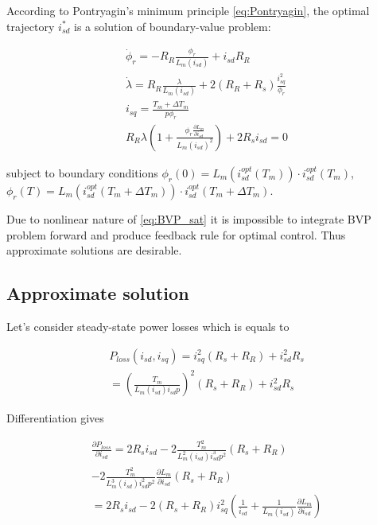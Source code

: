 \documentclass[journal]{IEEEtran}
\begin{document}
According to Pontryagin's minimum principle \eqref{eq:Pontryagin}, the optimal trajectory $i_{sd}^*$ is a solution of boundary-value problem:

\begin{equation}\label{eq:BVP_sat}
\begin{gathered}
\dot \phi_r = -R_R \frac{\phi_r}{L_m(i_{sd})} + i_{sd} R_R \\
\dot \lambda = R_R \frac{ \lambda}{L_m(i_{sd})} + 2 (R_R + R_s) \frac{i_{sq}^2}{\phi_r} \\
i_{sq} = \frac{T_m + \Delta T_m}{p \phi_r} \\
R_R \lambda \left( 1 + \frac{\phi_r \frac{\partial L_m}{\partial i_{sd}}}{L_m(i_{sd})^2} \right ) + 2 R_s i_{sd} = 0
\end{gathered}
\end{equation}

subject to boundary conditions $\phi_r(0) = L_m(i_{sd}^{opt}(T_m)) \cdot i_{sd}^{opt}(T_m)$, $\phi_r(T) = L_m(i_{sd}^{opt}(T_m+\Delta T_m)) \cdot i_{sd}^{opt}(T_m+\Delta T_m)$. 

Due to nonlinear nature of \eqref{eq:BVP_sat} it is impossible to integrate BVP problem forward and produce feedback rule for optimal control. Thus approximate solutions are desirable.

\subsection{Approximate solution}

Let's consider steady-state power losses which is equals to  

\begin{equation}\label{eq:P_loss_sat}
\begin{gathered}
 P_{loss}(i_{sd}, i_{sq}) = i_{sq}^2 (R_s + R_R) + i_{sd}^2 R_s \\
 = \left ( \frac{T_m}{L_m(i_{sd}) i_{sd} p} \right )^2 (R_s + R_R) + i_{sd}^2 R_s 
\end{gathered}
\end{equation}

Differentiation gives

\begin{equation}\label{eq:dP_loss_sat}
\begin{gathered}
\frac{\partial P_{loss}}{\partial i_{sd}} = 2 R_s i_{sd} - 2 \frac{T_m^2 }{L_m^2(i_{sd}) i_{sd}^3 p^2} (R_s + R_R) \\
- 2 \frac{T_m^2 }{L_m^3(i_{sd}) i_{sd}^2 p^2} \frac{\partial L_m}{\partial i_{sd}} (R_s + R_R) \\
= 2 R_s i_{sd} - 2 (R_s + R_R) i_{sq}^2 \left ( \frac{1}{i_{sd}} + \frac{1}{L_m(i_{sd})} \frac{\partial L_m}{\partial i_{sd}} \right )
\end{gathered}
\end{equation}
\end{document}
